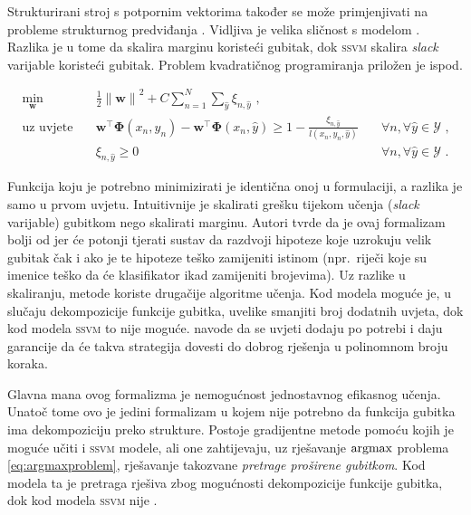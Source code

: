 Strukturirani stroj s potpornim vektorima  također se može primjenjivati na probleme strukturnog predviđanja
\citep{tsochantaridis2005large}. Vidljiva je velika sličnost s modelom \mmmm{}.
Razlika je u tome da \mmmm{} skalira marginu koristeći gubitak, dok
\textsc{ssvm} skalira \textit{slack} varijable koristeći gubitak. Problem
kvadratičnog programiranja priložen je ispod.

\begin{equation}\label{eq:ssvm}
\begin{aligned}
  \min_{\mathbf{w}} & \quad \frac{1}{2} {\lVert\mathbf{w}\lVert}^2 + C \sum_{n=1}^{N}\sum_{\hat{y}} \xi_{n,\hat{y}} \text{ ,}              & \\
  \text{uz uvjete}  & \quad \mathbf{w}^\top \mathbf{\Phi}(x_n, y_n) - \mathbf{w}^\top \mathbf{\Phi}(x_n, \hat{y}) \ge 1 - \frac{\xi_{n,\hat{y}}}{l(x_n, y_n, \hat{y})} & \quad \forall n, \forall \hat{y} \in \mathcal{Y} \text{ ,}\\
                    & \quad \xi_{n,\hat{y}} \ge 0                                                                                          & \quad \forall n, \forall \hat{y} \in \mathcal{Y} \text{ .}
\end{aligned}
\end{equation}

\noindent
Funkcija koju je potrebno minimizirati je identična onoj u \mmmm{} formulaciji, a
razlika je samo u prvom uvjetu. Intuitivnije je skalirati grešku tijekom učenja
(\textit{slack} varijable) gubitkom nego skalirati marginu. Autori tvrde da je
ovaj formalizam bolji od \mmmm{} jer će potonji tjerati sustav da razdvoji
hipoteze koje uzrokuju velik gubitak čak i ako je te hipoteze teško zamijeniti
istinom (npr.~riječi koje su imenice teško da će klasifikator ikad zamijeniti
brojevima). Uz razlike u skaliranju, metode koriste drugačije algoritme učenja.
Kod \mmmm{} modela moguće je, u slučaju dekompozicije funkcije gubitka, uvelike
smanjiti broj dodatnih uvjeta, dok kod modela \textsc{ssvm} to nije moguće.
\citet{tsochantaridis2005large} navode da se uvjeti dodaju po potrebi i daju
garancije da će takva strategija dovesti do dobrog rješenja u polinomnom broju
koraka.

Glavna mana ovog formalizma je nemogućnost jednostavnog efikasnog učenja. Unatoč
tome ovo je jedini formalizam u kojem nije potrebno da funkcija gubitka ima
dekompoziciju preko strukture. Postoje gradijentne metode pomoću kojih je moguće
učiti \mmmm{} i \textsc{ssvm} modele, ali one zahtijevaju, uz rješavanje
$\operatorname*{argmax}$ problema \ref{eq:argmaxproblem}, rješavanje takozvane \textit{pretrage
proširene gubitkom}. Kod \mmmm{} modela ta je pretraga rješiva zbog mogućnosti
dekompozicije funkcije gubitka, dok kod modela \textsc{ssvm} nije
\citep{ratliff2006maximum}.
